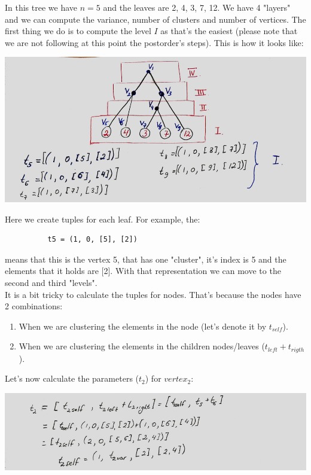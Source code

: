 \documentclass[11pt,a4paper,english]{article}
\begin{document}
        In this tree we have $n=5$ and the leaves are 2, 4, 3, 7, 12. We have 4 "layers" and we can compute the variance, number of clusters and number of vertices. The first thing we do is to compute the level $I$ as that's the easiest (please note that we are not following at this point the postorder's steps). This is how it looks like:
        \begin{center}
          \includegraphics[width=15cm]{sc_1.png}
        \end{center}
        Here we create tuples for each leaf. For example, the:
        \begin{verbatim}
          t5 = (1, 0, [5], [2])
        \end{verbatim}

        means that this is the vertex 5, that has one "cluster", it's index is 5 and the elements that it holds are [2]. With that representation we can move to the second and third "levels". \\
        It is a bit tricky to calculate the tuples for nodes. That's because the nodes have 2 combinations:
        \begin{enumerate}
          \item When we are clustering the elements in the node (let's denote it by $t_{self}$).
          \item When we are clustering the elements in the children nodes/leaves ($t_{left} + t_{rigth}$).
        \end{enumerate}

        Let's now calculate the parameters ($t_2$) for $vertex_2$:
        \begin{center}
          \includegraphics[width=15cm]{sc_2.png}
        \end{center}
\end{document}
